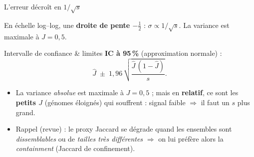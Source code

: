 \documentclass[aspectratio=169,11pt]{beamer}
\begin{document}
\begin{frame}{L'erreur décroît en $1/\sqrt{s}$}
  \centering

  \footnotesize\textcolor{cGray}{En échelle log--log, une \textbf{droite de pente $-\tfrac12$} :
  $\sigma \propto 1/\sqrt{s}$. La variance est maximale à $J=0{,}5$.}
\end{frame}

\begin{frame}{Intervalle de confiance \& limites}
  \footnotesize
  \textbf{IC à 95\,\%} (approximation normale) :
  \[ \hat J \;\pm\; 1{,}96\,\sqrt{\frac{\hat J\,(1-\hat J)}{s}}. \]
  \begin{itemize}
    \item La variance \emph{absolue} est maximale à $J=0{,}5$ ; mais en \textbf{relatif},
          ce sont les \textbf{petits $J$} (génomes éloignés) qui souffrent : signal faible
          $\Rightarrow$ il faut un $s$ plus grand.
    \item \textcolor{cGray}{Rappel (revue) : le proxy Jaccard se dégrade quand les ensembles
          sont \emph{dissemblables} ou de \emph{tailles très différentes} $\Rightarrow$ on lui
          préfère alors la \emph{containment} (Jaccard de confinement).}
  \end{itemize}
\end{frame}
\end{document}
